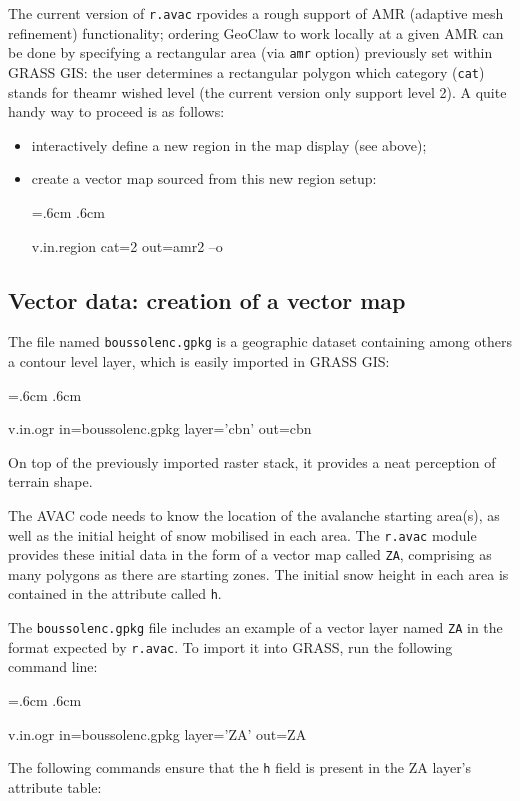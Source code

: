 \documentclass[12pt,oneside]{paper}
\newenvironment{code}{%
\vspace{2mm}%
\hangindent=.6cm%
\parindent.6cm%
\ttfamily%
\color{gris.3}%
}{
\vspace{2mm}%
}
\newcommand{\bei}{\begin{itemize}}
\newcommand{\eit}{\end{itemize}}
\begin{document}
The current version of \verb+r.avac+ rpovides a rough support of AMR (adaptive mesh refinement) functionality; ordering GeoClaw to work locally at a given AMR can be done by specifying a rectangular area (via \verb+amr+ option) previously set within GRASS GIS: the user determines a rectangular polygon which category (\verb+cat+) stands for theamr wished level (the current version only support level 2). A quite handy way to proceed is as follows:
\bei
\item interactively define a new region in the map display (see above);
\item create a vector map sourced from this new region setup: 

\begin{code}
v.in.region cat=2 out=amr2 --o
\end{code}
\eit

\subsection{Vector data: creation of a vector map}

The file named \texttt{boussolenc.gpkg} is a geographic dataset containing among others a contour level layer, which is easily imported in GRASS GIS:

\begin{code}
v.in.ogr in=boussolenc.gpkg layer='cbn' out=cbn
\end{code}

On top of the previously imported raster stack, it provides a neat perception of terrain shape.

The AVAC code needs to know the location of the avalanche starting area(s), as well as the initial height of snow mobilised in each area. The \texttt{r.avac} module provides these initial data in the form of a vector map called \texttt{ZA}, comprising as many polygons as there are starting zones. The initial snow height in each area is contained in the attribute called \texttt{h}.

The \texttt{boussolenc.gpkg} file includes an example of a vector layer named \texttt{ZA} in the format expected by \verb+r.avac+. To import it into GRASS, run the following command line:


\begin{code}
v.in.ogr in=boussolenc.gpkg layer='ZA' out=ZA
\end{code}

The following commands ensure that the \texttt{h} field is present in the ZA layer's attribute table:
\end{document}
